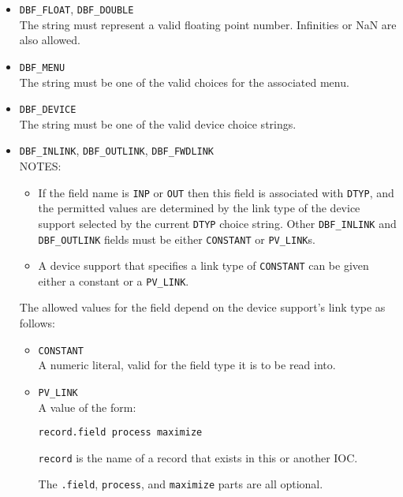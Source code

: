 \begin{description}
\begin{itemize}
\item \verb|DBF_FLOAT|, \verb|DBF_DOUBLE| \\
The string must represent a valid floating point number.
Infinities or NaN are also allowed.

\item \verb|DBF_MENU| \\
The string must be one of the valid choices for the associated menu.

\item \verb|DBF_DEVICE| \\
The string must be one of the valid device choice strings.

\item \verb|DBF_INLINK|, \verb|DBF_OUTLINK|, \verb|DBF_FWDLINK| \\
NOTES:

\begin{itemize}
\item If the field name is \verb|INP| or \verb|OUT| then this field is associated with \verb|DTYP|, and the permitted values are determined by the link type of the device support selected by the current \verb|DTYP| choice string.
Other \verb|DBF_INLINK| and \verb|DBF_OUTLINK| fields must be either \verb|CONSTANT| or \verb|PV_LINK|s.

\item A device support that specifies a link type of \verb|CONSTANT| can be given either a constant or a \verb|PV_LINK|.
\end{itemize}

The allowed values for the field depend on the device support's link type as follows:

\begin{itemize}
\item \verb|CONSTANT| \\
A numeric literal, valid for the field type it is to be read into.

\item \verb|PV_LINK| \\
A value of the form:

\begin{lstlisting}[language=dbd]
record.field process maximize
\end{lstlisting}

\verb|record| is the name of a record that exists in this or another IOC.

The \verb|.field|, \verb|process|, and \verb|maximize| parts are all optional.


\end{itemize}
\end{itemize}
\end{description}
